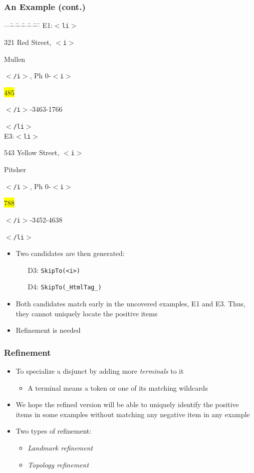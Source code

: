 \documentclass[svgnames]{beamer}
\newcounter{curtagcolor}
\newcommand{\xbtag}[1]{\textcolor{tagcolor!![\thecurtagcolor]}{$<$\texttt{#1}$>$}}
\newcommand{\xetag}[1]{\textcolor{tagcolor!![\thecurtagcolor]}{$<$\texttt{/#1}$>$}}
\newcommand{\xctag}[2]{\xbtag{#1}\addtocounter{curtagcolor}{1}#2\addtocounter{curtagcolor}{-1}\xetag{#1}}
\newenvironment{xml}{
  \begin{minipage}{.6\textwidth}
    \begin{tabbing}
      ---\=---\=---\=---\=---\=---\=\kill}{   
    \end{tabbing}
  \end{minipage}
}
\begin{document}
\begin{frame} \frametitle{An Example (cont.)}
  
  \begin{exampleblock}{}
    \centering \scriptsize
    \begin{xml}
      E1:\xctag{li}{321 Red Street, \xctag{i}{Mullen}, Ph
        0-\xctag{i}{\colorbox{yellow}{485}}-3463-1766} \\
      E3:\xctag{li}{543 Yellow Street, \xctag{i}{Pitsher}, Ph
        0-\xctag{i}{\colorbox{yellow}{788}}-3452-4638}
    \end{xml}
  \end{exampleblock}

  \begin{itemize}
  \item Two candidates are then generated:
    \begin{itemize}
    \item[D3:] \texttt{SkipTo(<i>)}
    \item[D4:] \texttt{SkipTo(\_HtmlTag\_)}
    \end{itemize}
  \item Both candidates match early in the uncovered examples, E1 and E3. Thus,
    they cannot uniquely locate the positive items
  \item Refinement is needed
  \end{itemize}

\end{frame}


\begin{frame} \frametitle{Refinement}
  
  \begin{itemize}
  \item To specialize a disjunct by adding more \emph{terminals} to it
    \begin{itemize}
    \item A terminal means a token or one of its matching wildcards
    \end{itemize}
  \item We hope the refined version will be able to uniquely identify the
    positive items in some examples without matching any negative item in any
    example
  \item Two types of refinement:
    \begin{itemize}
    \item \emph{Landmark refinement}
    \item \emph{Topology refinement}
    \end{itemize}
  \end{itemize}

\end{frame}
\end{document}
